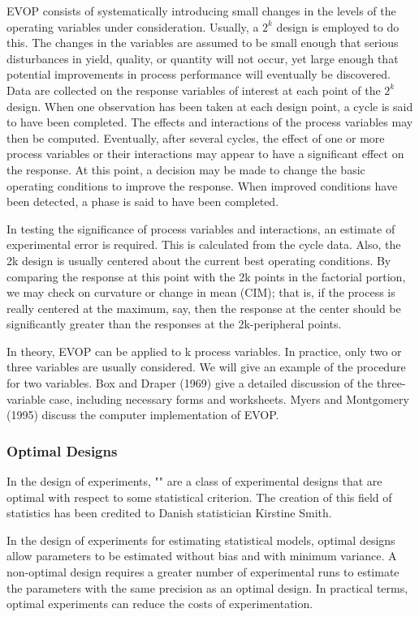 	EVOP consists of systematically introducing small changes in the levels of the operating variables under consideration. Usually, a $2^k$ design is employed to do this. The changes in the variables are assumed to be small enough that serious disturbances in yield, quality, or quantity will not occur, yet large enough that potential improvements in process performance will eventually be discovered. Data are collected on the response variables of interest at each point of the $2^k$ design. When one observation has been taken at each design point, a cycle is said to have been completed. The effects and interactions of the process variables may then be computed. Eventually, after several cycles, the effect of one or more process variables or their interactions may appear to have a significant effect on the response. At this point, a decision may be made to change the basic operating conditions to improve the response. When improved conditions have been detected, a phase is said to have been completed. 
	
	In testing the significance of process variables and interactions, an estimate of experimental error is required. This is calculated from the cycle data. Also, the 2k design is usually centered about the current best operating conditions. By comparing the response at this point with the 2k points in the factorial portion, we may check on curvature or change in mean (CIM); that is, if the process is really centered at the maximum, say, then the response at the center should be significantly greater than the responses at the 2k-peripheral points.
	
	In theory, EVOP can be applied to k process variables. In practice, only two or three variables are usually considered. We will give an example of the procedure for two variables. Box and Draper (1969) give a detailed discussion of the three-variable case, including necessary forms and worksheets. Myers and Montgomery (1995) discuss the computer implementation of EVOP.
	
	\pagebreak
	\subsubsection{Optimal Designs}
	In the design of experiments, "" are a class of experimental designs that are optimal with respect to some statistical criterion. The creation of this field of statistics has been credited to Danish statistician Kirstine Smith.

	In the design of experiments for estimating statistical models, optimal designs allow parameters to be estimated without bias and with minimum variance. A non-optimal design requires a greater number of experimental runs to estimate the parameters with the same precision as an optimal design. In practical terms, optimal experiments can reduce the costs of experimentation.
	

